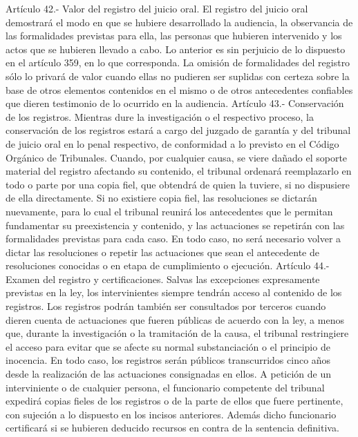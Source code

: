     Artículo 42.- Valor del registro del juicio oral. El registro del juicio oral demostrará el modo en que se hubiere desarrollado la audiencia, la observancia de las formalidades previstas para ella, las personas que hubieren intervenido y los actos que se hubieren llevado a cabo. Lo anterior es sin perjuicio de lo dispuesto en el artículo 359, en lo que corresponda.
    La omisión de formalidades del registro sólo lo privará de valor cuando ellas no pudieren ser suplidas con certeza sobre la base de otros elementos contenidos en el mismo o de otros antecedentes confiables que dieren testimonio de lo ocurrido en la audiencia.
    Artículo 43.- Conservación de los registros. Mientras dure la investigación o el respectivo proceso, la conservación de los registros estará a cargo del juzgado de garantía y del tribunal de juicio oral en lo penal respectivo, de conformidad a lo previsto en el Código Orgánico de Tribunales.
    Cuando, por cualquier causa, se viere dañado el soporte material del registro afectando su contenido, el tribunal ordenará reemplazarlo en todo o parte por una copia fiel, que obtendrá de quien la tuviere, si no dispusiere de ella directamente.
    Si no existiere copia fiel, las resoluciones se dictarán nuevamente, para lo cual el tribunal reunirá los antecedentes que le permitan fundamentar su preexistencia y contenido, y las actuaciones se repetirán con las formalidades previstas para cada caso. En todo caso, no será necesario volver a dictar las resoluciones o repetir las actuaciones que sean el antecedente de resoluciones conocidas o en etapa de cumplimiento o ejecución.
    Artículo 44.- Examen del registro y certificaciones. Salvas las excepciones expresamente previstas en la ley, los intervinientes siempre tendrán acceso al contenido de los registros.
    Los registros podrán también ser consultados por terceros cuando dieren cuenta de actuaciones que fueren públicas de acuerdo con la ley, a menos que, durante la investigación o la tramitación de la causa, el tribunal restringiere el acceso para evitar que se afecte su normal substanciación o el principio de inocencia.
    En todo caso, los registros serán públicos transcurridos cinco años desde la realización de las actuaciones consignadas en ellos.
    A petición de un interviniente o de cualquier persona, el funcionario competente del tribunal expedirá copias fieles de los registros o de la parte de ellos que fuere pertinente, con sujeción a lo dispuesto en los incisos anteriores.
    Además dicho funcionario certificará si se hubieren deducido recursos en contra de la sentencia definitiva.
